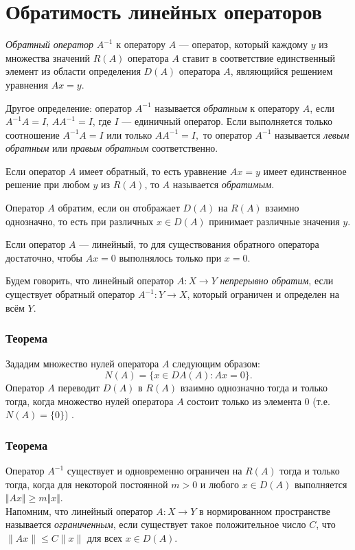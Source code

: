 \section{Обратимость линейных операторов}
\textit{Обратный оператор} $A^{-1}$ к оператору $A$ --- оператор, который каждому $y$ из множества значений $R(A)$ оператора $A$ ставит в соответствие единственный элемент из области определения $D(A)$ оператора $A$, являющийся решением уравнения $Ax = y$.

Другое определение: оператор $A^{-1}$ называется \textit{обратным} к оператору $A$, если ${\displaystyle A^{-1}A=I,\,AA^{-1}=I}$, где $I$ --- единичный оператор. Если выполняется только соотношение ${\displaystyle A^{-1}A=I}$ или только ${\displaystyle AA^{-1}=I,}$ то оператор $A^{-1}$ называется \textit{левым обратным} или \textit{правым обратным} соответственно.

Если оператор $A$ имеет обратный, то есть уравнение ${\displaystyle Ax=y}$ имеет единственное решение при любом $y$ из $R(A)$, то $A$ называется \textit{обратимым}.

Оператор $A$ обратим, если он отображает ${\displaystyle D(A)}$ на ${\displaystyle R(A)}$ взаимно однозначно, то есть при различных ${\displaystyle x\in D(A)}$ принимает различные значения $y$.

Если оператор $A$ --- линейный, то для существования обратного оператора достаточно, чтобы $A x = 0$ выполнялось только при $x = 0$.

Будем говорить, что линейный оператор $A:X\rightarrow Y$ \textit{непрерывно обратим}, если существует обратный оператор $A^{-1} : Y \rightarrow X$, который ограничен и определен на всём $Y$.

\subsubsection*{Теорема}
Зададим множество нулей оператора $A$ следующим образом:
$$N(A)=\{x \in DA(A) : Ax=0\}.$$
Оператор $A$ переводит $D(A)$ в $R(A)$ взаимно однозначно тогда и только тогда, когда множество нулей оператора $A$ состоит только из элемента $0$ (т.е. $N(A) = \{0\}$) \cite[с.~127]{trenogin}.

\subsubsection*{Теорема}
Оператор $A^{-1}$ существует и одновременно ограничен на $R(A)$ тогда и только тогда, когда для некоторой постоянной $m > 0$ и любого $x \in D(A)$ выполняется $\Vert Ax \Vert \geqslant m \Vert x \Vert$\cite[с.~127]{trenogin}.\\
Напомним, что линейный оператор $A:X\to Y$ в нормированном пространстве называется \textit{ограниченным}, если существует такое положительное число $C$, что $\|Ax\| \leqslant C\|x\|$ для всех $x \in D(A)$.


